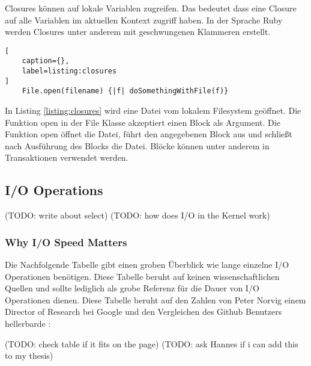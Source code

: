 Closures können auf lokale Variablen zugreifen. Das bedeutet dass eine Closure auf alle Variablen im aktuellen Kontext zugriff haben. In der Sprache Ruby werden Closures unter anderem mit geschwungenen Klammeren erstellt. \cite[]{fow04} 

\begin{lstlisting}[
	caption={},
	label=listing:closures
]
	File.open(filename) {|f| doSomethingWithFile(f)}
\end{lstlisting}
\cite[]{fow04}

In Listing \ref{listing:closures} wird eine Datei vom lokalem Filesystem geöffnet. Die Funktion open in der File Klasse akzeptiert einen Block als Argument. Die Funktion open öffnet die Datei, führt den angegebenen Block aus und schließt nach Ausführung des Blocks die Datei. Blöcke können unter anderem in Transaktionen verwendet werden. \cite[]{fow04}


\subsection{I/O Operations}
\label{subsection: io_operationen}

(TODO: write about select)
(TODO: how does I/O in the Kernel work)


\subsubsection{Why I/O Speed Matters}
Die Nachfolgende Tabelle gibt einen groben Überblick wie lange einzelne I/O Operationen benötigen. Diese Tabelle beruht auf keinen wissenschaftlichen Quellen und sollte lediglich als grobe Referenz für die Dauer von I/O Operationen dienen. Diese Tabelle beruht auf den Zahlen von Peter Norvig \cite[]{Nor98} einem Director of Research bei Google und den Vergleichen des Github Benutzers hellerbarde \cite[]{Gis15}: 

(TODO: check table if it fits on the page)
(TODO: ask Hannes if i can add this to my thesis)

